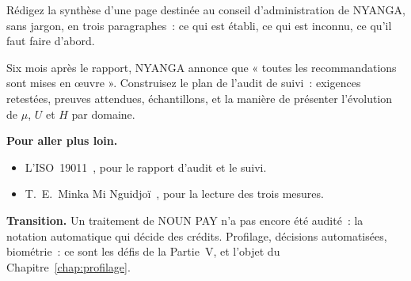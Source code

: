 \begin{boxexo}[title={\ding{45}\quad Exercice~16.3. La page du conseil \niveaumoyen}]
Rédigez la synthèse d'une page destinée au conseil d'administration de
NYANGA, sans jargon, en trois paragraphes~: ce qui est établi, ce qui est
inconnu, ce qu'il faut faire d'abord.
\end{boxexo}

\begin{boxexo}[title={\ding{45}\quad Exercice~16.4. L'audit de suivi \niveauexpert}]
Six mois après le rapport, NYANGA annonce que « toutes les recommandations
sont mises en œuvre ». Construisez le plan de l'audit de suivi~: exigences
retestées, preuves attendues, échantillons, et la manière de présenter
l'évolution de $\mu$, $U$ et $H$ par domaine.
\end{boxexo}

\bigskip

\begin{boxinfo}
\textbf{Pour aller plus loin.}
\begin{itemize}
    \item L'ISO~19011~\cite{iso19011_2018}, pour le rapport d'audit et le
          suivi.
    \item T.~E.~Minka Mi Nguidjoï~\cite{minka2026nek}, pour la lecture des
          trois mesures.
\end{itemize}
\end{boxinfo}

\begin{boxinfo}
\textbf{Transition.} Un traitement de NOUN PAY n'a pas encore été audité~:
la notation automatique qui décide des crédits. Profilage, décisions
automatisées, biométrie~: ce sont les défis de la Partie~V, et l'objet du
Chapitre~\ref{chap:profilage}.
\end{boxinfo}
